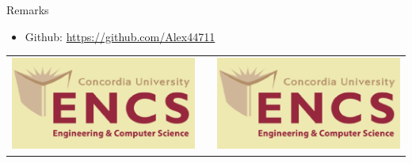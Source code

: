\documentclass[final]{beamer}
\newlength{\onecolwid}
\begin{document}
\begin{frame}[t]
\begin{columns}[t]
\begin{column}{\onecolwid}

\begin{alertblock}{Remarks}

\begin{itemize}
\item Github: \href{https://github.com/Alex44711}{https://github.com/Alex44711}
\end{itemize}

\end{alertblock}

\begin{center}
\begin{tabular}{ccc}
\includegraphics[width=0.4\linewidth]{encs.png} & \hfill & \includegraphics[width=0.4\linewidth]{encs.png}
\end{tabular}
\end{center}


\end{column} %

\end{columns} %

\end{frame} %
\end{document}
